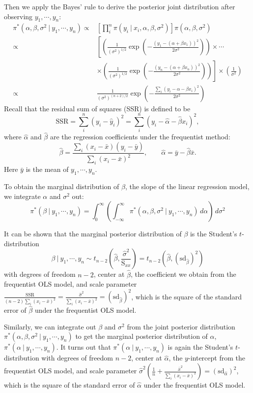 \documentclass[]{book}
\theoremstyle{definition}
\theoremstyle{definition}
\theoremstyle{definition}
\theoremstyle{remark}
\begin{document}
Then we apply the Bayes' rule to derive the posterior joint distribution
after observing \(y_1,\cdots, y_n\): \[
\begin{aligned}
\pi^*(\alpha, \beta, \sigma^2~|~y_1,\cdots,y_n) \propto & \left[\prod_i^n\pi(y_i~|~x_i,\alpha,\beta,\sigma^2)\right]\pi(\alpha, \beta,\sigma^2) \\
\propto & \left[\left(\frac{1}{(\sigma^2)^{1/2}}\exp\left(-\frac{(y_1-(\alpha+\beta x_1 ))^2}{2\sigma^2}\right)\right)\times\cdots \right.\\
& \left. \times \left(\frac{1}{(\sigma^2)^{1/2}}\exp\left(-\frac{(y_n-(\alpha +\beta x_n))^2}{2\sigma^2}\right)\right)\right]\times\left(\frac{1}{\sigma^2}\right)\\
\propto & \frac{1}{(\sigma^2)^{(n+2)/2}}\exp\left(-\frac{\sum_i\left(y_i-\alpha-\beta  x_i\right)^2}{2\sigma^2}\right)
\end{aligned}
\] Recall that the residual sum of squares (SSR) is defined to be
\[ \text{SSR} = \sum_i^n (y_i - \hat{y}_i)^2 = \sum_i^n \left(y_i - \hat{\alpha} - \hat{\beta} x_i\right)^2, \]
where \(\hat{\alpha}\) and \(\hat{\beta}\) are the regression
coefficients under the frequentist method: \[ 
\hat{\beta} = \frac{\sum_i (x_i-\bar{x})(y_i-\bar{y})}{\sum_i (x_i-\bar{x})^2},\qquad \hat{\alpha} = \bar{y}-\hat{\beta}\bar{x}. 
\] Here \(\bar{y}\) is the mean of \(y_1,\cdots,y_n\).

To obtain the marginal distribution of \(\beta\), the slope of the
linear regression model, we integrate \(\alpha\) and \(\sigma^2\) out:
\[ \pi^*(\beta~|~y_1,\cdots,y_n) = \int_0^\infty \left(\int_{-\infty}^\infty \pi^*(\alpha, \beta, \sigma^2~|~y_1,\cdots, y_n)\, d\alpha\right)\, d\sigma^2 \]

It can be shown that the marginal posterior distribution of \(\beta\) is
the Student's \(t\)-distribution
\[ \beta~|~y_1,\cdots,y_n \sim t_{n-2}\left(\hat{\beta}, \frac{\hat{\sigma}^2}{\text{S}_{xx}}\right) = t_{n-2}\left(\hat{\beta}, (\text{sd}_{\hat{\beta}})^2\right) \]
with degrees of freedom \(n-2\), center at \(\hat{\beta}\), the
coefficient we obtain from the frequentist OLS model, and scale
parameter
\(\displaystyle \frac{\text{SSR}}{(n-2)\sum_i(x_i-\bar{x})^2} = \frac{\hat{\sigma}^2}{\sum_i (x_i-\bar{x})^2}=\left(\text{sd}_{\hat{\beta}}\right)^2\),
which is the square of the standard error of \(\hat{\beta}\) under the
frequentist OLS model.

Similarly, we can integrate out \(\beta\) and \(\sigma^2\) from the
joint posterior distribution
\(\pi^*(\alpha, \beta, \sigma^2~|~y_1,\cdots, y_n)\) to get the marginal
posterior distribution of \(\alpha\),
\(\pi^*(\alpha~|~y_1,\cdots, y_n)\). It turns out that
\(\pi^*(\alpha~|~y_1,\cdots,y_n)\) is again the Student's
\(t\)-distribution with degrees of freedom \(n-2\), center at
\(\hat{\alpha}\), the \(y\)-intercept from the frequentist OLS model,
and scale parameter
\(\displaystyle \hat{\sigma}^2\left(\frac{1}{n}+\frac{\bar{x}^2}{\sum_i (x_i-\bar{x})^2}\right) = \left(\text{sd}_{\hat{\alpha}}\right)^2\),
which is the square of the standard error of \(\hat{\alpha}\) under the
frequentist OLS model.
\end{document}
